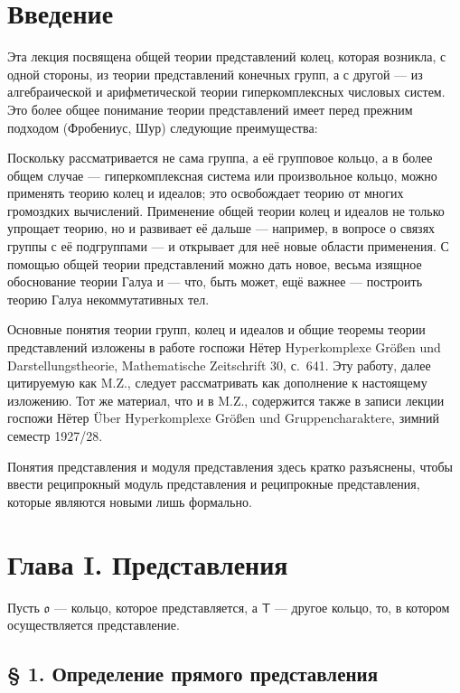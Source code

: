 \documentclass[11pt]{article}
\newcommand{\foreign}[1]{#1}
\begin{document}
\clearpage
\section*{Введение}\label{einleitung}

Эта лекция посвящена общей теории представлений колец, которая
возникла, с одной стороны, из теории представлений конечных групп, а
с другой --- из алгебраической и арифметической теории
гиперкомплексных числовых систем. Это более общее понимание теории
представлений имеет перед прежним подходом (Фробениус, Шур) следующие
преимущества:

Поскольку рассматривается не сама группа, а её групповое кольцо, а
в более общем случае --- гиперкомплексная система или произвольное
кольцо, можно применять теорию колец и идеалов; это освобождает теорию
от многих громоздких вычислений. Применение общей теории колец и
идеалов не только упрощает теорию, но и развивает её дальше ---
например, в вопросе о связях группы с её подгруппами --- и открывает
для неё новые области применения. С помощью общей теории
представлений можно дать новое, весьма изящное обоснование теории
Галуа и --- что, быть может, ещё важнее --- построить теорию Галуа
некоммутативных тел.

Основные понятия теории групп, колец и идеалов и общие теоремы теории
представлений изложены в работе госпожи Нётер
\foreign{Hyperkomplexe Größen und Darstellungstheorie},
\foreign{Mathematische Zeitschrift} 30, с.~641. Эту работу, далее
цитируемую как M.Z., следует рассматривать как дополнение к настоящему
изложению. Тот же материал, что и в M.Z., содержится также в записи
лекции госпожи Нётер
\foreign{Über Hyperkomplexe Größen und Gruppencharaktere}, зимний
семестр 1927/28.

Понятия представления и модуля представления здесь кратко разъяснены,
чтобы ввести реципрокный модуль представления и реципрокные
представления, которые являются новыми лишь формально.

\section*{Глава I. Представления}\label{kapitel-i.-darstellungen}

Пусть $\mathfrak{o}$ --- кольцо, которое представляется, а $\mathsf T$
--- другое кольцо, то, в котором осуществляется представление.

\subsection*{§ 1. Определение прямого представления}\label{definition-der-direkten-darstellung}
\end{document}
